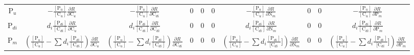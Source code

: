 \documentclass[12pt, a4paper]{article}
\begin{document}
\begin{table}[hb]
{\begin{tabular}{ c | ccccccccc }
  P$_u$      &
  $-\frac{[\text{P}_u]}{[\text{C}_u]}\frac{\partial R}{\partial \text{C}_u}$  & 
  $-\frac{[\text{P}_u]}{[\text{C}_u]}\frac{\partial R}{\partial \text{C}_{di}}$ & 
  0 & 
  0 &
  0&
  $-\frac{[\text{P}_u]}{[\text{C}_u]}\frac{\partial R}{\partial \text{N}_m} $ & 
  0 &
  0&
  $-\frac{[\text{P}_u]}{[\text{C}_u]}\frac{\partial R}{\partial \text{P}_m} $\\
  
  P$_{di}$    &
  $d_i\frac{[\text{P}_{di}]}{[\text{C}_{di}]} \frac{\partial R}{\partial \text{C}_u}$  & 
  $d_i\frac{[\text{P}_{di}]}{[\text{C}_{di}]} \frac{\partial R}{\partial \text{C}_{di}}$  & 
  0 & 
  0 & 
  0  & 
  $d_i\frac{[\text{P}_{di}]}{[\text{C}_{di}]} \frac{\partial R}{\partial \text{N}_m}$ & 
  0 & 
  0  & 
  $d_i\frac{[\text{P}_{di}]}{[\text{C}_{di}]} \frac{\partial R}{\partial \text{P}_m}$\\
  
  P$_m$    &
  $\left(\frac{[\text{P}_u]}{[\text{C}_u]} - \sum d_i \frac{[\text{P}_{di}]}{[\text{C}_{di}]}\right)\frac{\partial R}{\partial \text{C}_u}$  & $\left(\frac{[\text{P}_u]}{[\text{C}_u]} - \sum d_i \frac{[\text{P}_{di}]}{[\text{C}_{di}]}\right)\frac{\partial R}{\partial \text{C}_{di}} $  & 
  0 & 
  0   & 
  0 & 
  $\left(\frac{[\text{P}_u]}{[\text{C}_u]} - \sum d_i \frac{[\text{P}_{di}]}{[\text{C}_{di}}]\right) \frac{\partial R}{\partial \text{N}_m} $ & 
  0   & 
  0 & 
  $\left(\frac{[\text{P}_u]}{[\text{C}_u]} - \sum d_i \frac{[\text{P}_{di}]}{[\text{C}_{di}}]\right) \frac{\partial R}{\partial \text{P}_m} $ \\
  \end{tabular}
  }
\end{table}
\end{document}
